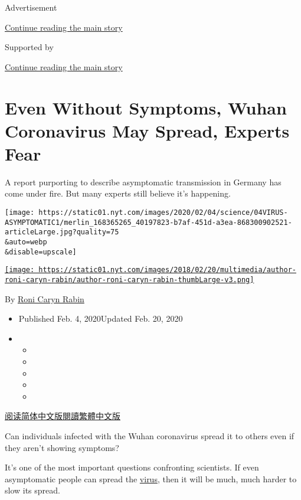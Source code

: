 Advertisement

\protect\hyperlink{after-top}{Continue reading the main story}

Supported by

\protect\hyperlink{after-sponsor}{Continue reading the main story}

\hypertarget{even-without-symptoms-wuhan-coronavirus-may-spread-experts-fear}{%
\section{Even Without Symptoms, Wuhan Coronavirus May Spread, Experts
Fear}\label{even-without-symptoms-wuhan-coronavirus-may-spread-experts-fear}}

A report purporting to describe asymptomatic transmission in Germany has
come under fire. But many experts still believe it's happening.

\texttt{[image: https://static01.nyt.com/images/2020/02/04/science/04VIRUS-ASYMPTOMATIC1/merlin\_168365265\_40197823-b7af-451d-a3ea-868300902521-articleLarge.jpg?quality=75\\\&auto=webp\\\&disable=upscale]}

\href{https://www.nytimes.com/by/roni-caryn-rabin}{\texttt{[image: https://static01.nyt.com/images/2018/02/20/multimedia/author-roni-caryn-rabin/author-roni-caryn-rabin-thumbLarge-v3.png]}}

By \href{https://www.nytimes.com/by/roni-caryn-rabin}{Roni Caryn Rabin}

\begin{itemize}
\item
  Published Feb. 4, 2020Updated Feb. 20, 2020
\item
  \begin{itemize}
  \item
  \item
  \item
  \item
  \item
  \end{itemize}
\end{itemize}

\href{https://cn.nytimes.com/health/20200205/coronavirus-symptoms-germany/}{阅读简体中文版}\href{https://cn.nytimes.com/health/20200205/coronavirus-symptoms-germany/zh-hant/}{閱讀繁體中文版}

Can individuals infected with the Wuhan coronavirus spread it to others
even if they aren't showing symptoms?

It's one of the most important questions confronting scientists. If even
asymptomatic people can spread the
\href{https://www.nytimes.com/2020/02/20/world/asia/japan-coronavirus-clusters.html}{virus},
then it will be much, much harder to slow its spread.

